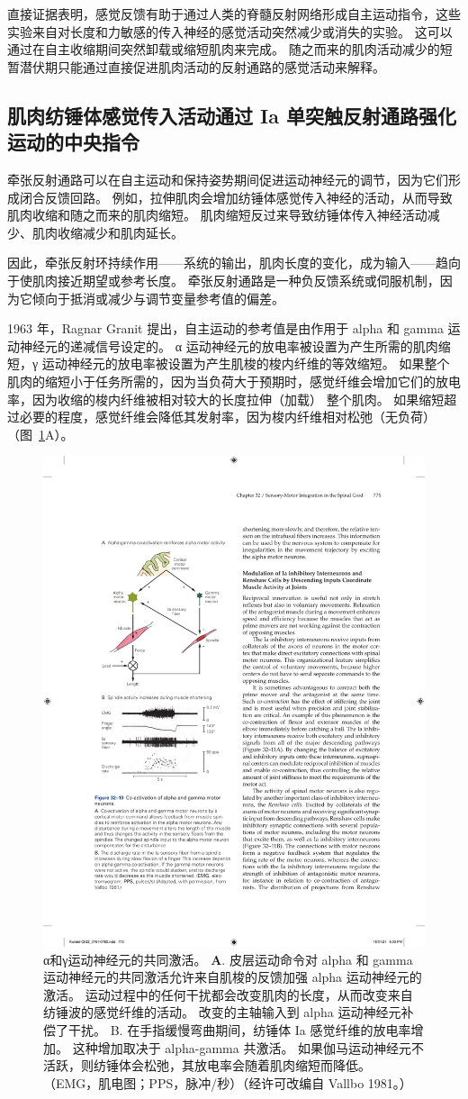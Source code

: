 直接证据表明，感觉反馈有助于通过人类的脊髓反射网络形成自主运动指令，这些实验来自对长度和力敏感的传入神经的感觉活动突然减少或消失的实验。
这可以通过在自主收缩期间突然卸载或缩短肌肉来完成。
随之而来的肌肉活动减少的短暂潜伏期只能通过直接促进肌肉活动的反射通路的感觉活动来解释。



\subsection{肌肉纺锤体感觉传入活动通过 Ia 单突触反射通路强化运动的中央指令}

牵张反射通路可以在自主运动和保持姿势期间促进运动神经元的调节，因为它们形成闭合反馈回路。
例如，拉伸肌肉会增加纺锤体感觉传入神经的活动，从而导致肌肉收缩和随之而来的肌肉缩短。
肌肉缩短反过来导致纺锤体传入神经活动减少、肌肉收缩减少和肌肉延长。


因此，牵张反射环持续作用——系统的输出，肌肉长度的变化，成为输入——趋向于使肌肉接近期望或参考长度。
牵张反射通路是一种负反馈系统或伺服机制，因为它倾向于抵消或减少与调节变量参考值的偏差。


1963 年，Ragnar Granit 提出，自主运动的参考值是由作用于 alpha 和 gamma 运动神经元的递减信号设定的。
α 运动神经元的放电率被设置为产生所需的肌肉缩短，γ 运动神经元的放电率被设置为产生肌梭的梭内纤维的等效缩短。
如果整个肌肉的缩短小于任务所需的，因为当负荷大于预期时，感觉纤维会增加它们的放电率，因为收缩的梭内纤维被相对较大的长度拉伸（加载） 整个肌肉。
如果缩短超过必要的程度，感觉纤维会降低其发射率，因为梭内纤维相对松弛（无负荷）（图~\ref{fig:32_10}A）。


\begin{figure}[htbp]
	\centering
	\includegraphics[width=0.5\linewidth]{chap32/fig_32_10}
	\caption{α和γ运动神经元的共同激活。
	\textbf{A}. 皮层运动命令对 alpha 和 gamma 运动神经元的共同激活允许来自肌梭的反馈加强 alpha 运动神经元的激活。
	运动过程中的任何干扰都会改变肌肉的长度，从而改变来自纺锤波的感觉纤维的活动。
	改变的主轴输入到 alpha 运动神经元补偿了干扰。
	B. 在手指缓慢弯曲期间，纺锤体 Ia 感觉纤维的放电率增加。
	这种增加取决于 alpha-gamma 共激活。
	如果伽马运动神经元不活跃，则纺锤体会松弛，其放电率会随着肌肉缩短而降低。 （EMG，肌电图；PPS，脉冲/秒）（经许可改编自 Vallbo 1981。）}
	\label{fig:32_10}
\end{figure}


